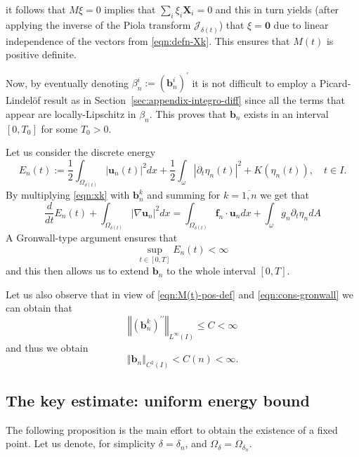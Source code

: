 \documentclass[10pt,a4paper]{article}
\numberwithin{equation}{section}
\begin{document}
it follows that $M\xi=0$ implies that $\sum_{i}\xi_i \mathbf{X}_{i}=0$ and this in turn  yields (after applying the inverse of the Piola transform $\mathcal{J}_{\delta(t)}$) that $\xi=\mathbf{0}$ due to linear independence of the vectors from \eqref{eqn:defn-Xk}. This ensures that $M(t)$ is positive definite.

Now, by eventually denoting $\beta_{n}^{i}:=\left(\mathbf{b}_{n}^{i}\right)^{\prime}$
 it is not difficult to employ a Picard-Lindel\"{o}f result as in Section~\ref{sec:appendix-integro-diff}  since all the terms that appear are locally-Lipschitz in $\beta_n$. This  proves that $\mathbf{b}_n$ exists in an interval $[0,T_0]$ for some $T_0 >0$.  
 


Let us consider the discrete energy
\begin{equation}\label{eqn:def-E(t)}
E_{n}\left(t\right):=\frac{1}{2}\int_{\Omega_{\delta\left(t\right)}}\left|\mathbf{u}_{n}\left(t\right)\right|^{2}dx+\frac{1}{2}\int_{\omega}\left|\partial_{t}\eta_{n}\left(t\right)\right|^{2}+K\left(\eta_{n}\left(t\right)\right),\quad t\in I.
\end{equation}
By multiplying  \eqref{eqn:xk} with $\mathbf{b}_{n}^{k}$ and summing for  $k=\overline{1,n}$ we get that
 \begin{equation}\label{eqn:energy-1}
\frac{d}{dt}E_{n}\left(t\right)+\int_{\Omega_{\delta\left(t\right)}}\left|\nabla\mathbf{u}_{n}\right|^{2}dx=\int_{\Omega_{\delta\left(t\right)}}\mathbf{f}_{n}\cdot\mathbf{u}_{n}dx+\int_{\omega}g_{n}\partial_{t}\eta_{n}dA
\end{equation}
A Gronwall-type argument ensures that 
\begin{equation}\label{eqn:cons-gronwall}
\sup_{t\in\left[0,T\right]}E_{n}\left(t\right)<\infty 
\end{equation}
and this  then allows us to extend $\mathbf{b}_n$ to the whole  interval  $[0,T]$.


Let us also observe that in view of \eqref{eqn:M(t)-pos-def} and \eqref{eqn:cons-gronwall} we can obtain  that
\[
\left\Vert \left(\mathbf{b}_{n}^{k}\right)^{\prime\prime}\right\Vert _{L^{\infty}\left(I\right)}\le C<\infty
\] and thus we obtain 
\[\left\Vert \mathbf{b}_{n}\right\Vert _{C^{2}\left(I\right)}<C\left(n\right)<\infty.
\]


\subsection{The key estimate: uniform energy bound}
The following proposition is the main effort to obtain the existence of a fixed point. Let us denote, for simplicity $\delta=\delta_{n}$, and $\Omega_{\delta}=\Omega_{\delta_{n}}$.
\end{document}
